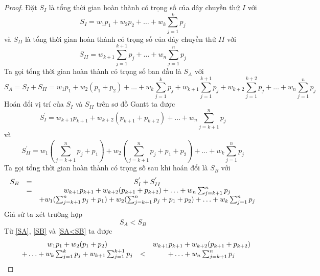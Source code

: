 \documentclass[12pt,a4paper]{report}
\begin{document}
\begin{proof}
	Đặt $S_I$ là tổng thời gian hoàn thành có trọng số của dây chuyền thứ $I$ với
	\begin{equation}
		S_I = w_1 p_1 + w_2 p_2 + \ldots + w_k \sum_{j=1}^k p_j
	\end{equation}
	và $S_{II}$ là tổng thời gian hoàn thành có trọng số của dây chuyền thứ $II$ với
	\begin{equation}
		S_{II} = w_{k+1} \sum_{j=1}^{k+1} p_j + \ldots + w_n \sum_{j=1}^{n} p_j
	\end{equation}
	Ta gọi tổng thời gian hoàn thành có trọng số ban đầu là $S_A$ với
	\begin{equation} \label{SA}
		S_A = S_I + S_{II} = w_1 p_1 + w_2 (p_1 + p_2) + \ldots + w_k \sum_{j=1}^k p_j + w_{k+1} \sum_{j=1}^{k+1} p_j + w_{k+2} \sum_{j=1}^{k+2} p_j + \ldots + w_n \sum_{j=1}^{n} p_j
	\end{equation}
	Hoán đổi vị trí của $S_I$ và $S_{II}$ trên sơ đồ Gantt ta được
	\begin{equation}
		S_I^{'} = w_{k+1} p_{k+1} + w_{k+2}(p_{k+1} + p_{k+2}) + \ldots + w_n \sum_{j=k+1}^{n} p_j
	\end{equation}
	và
	\begin{equation}
		S_{II}^{'} = w_1(\sum_{j=k+1}^{n}p_j+p_1) + w_2(\sum_{j=k+1}^{n}p_j+p_1+p_2) + \ldots + w_k\sum_{j=1}^{n} p_j
	\end{equation}
	Ta gọi tổng thời gian hoàn thành có trọng số sau khi hoán đổi là $S_B$ với
	\begin{equation} \label{SB}
		\begin{array}{c c c}
		S_B &=& S_I^{'} + S_{II}^{'} \\
		&=& w_{k+1} p_{k+1} + w_{k+2}(p_{k+1} + p_{k+2}) + \ldots + w_n \sum_{j=k+1}^{n} p_j \\
		&& + w_1(\sum_{j=k+1}^{n}p_j+p_1) + w_2(\sum_{j=k+1}^{n}p_j+p_1+p_2) + \ldots + w_k\sum_{j=1}^{n} p_j
		\end{array}
	\end{equation}
	Giả sử ta xét trường hợp
	\begin{equation} \label{SA<SB}
		S_A < S_B
	\end{equation}
	Từ \eqref{SA}, \eqref{SB} và \eqref{SA<SB} ta được
	\begin{equation*}
	\begin{array}{c c c c}
	& w_1 p_1 + w_2 (p_1 + p_2)  && w_{k+1} p_{k+1} + w_{k+2}(p_{k+1} + p_{k+2}) \\

	& + \ldots + w_k \sum_{j=1}^k p_j + w_{k+1} \sum_{j=1}^{k+1} p_j &<& + \ldots + w_n \sum_{j=k+1}^{n} p_j \\
	

\end{array}
\end{equation*}
\end{proof}
\end{document}
